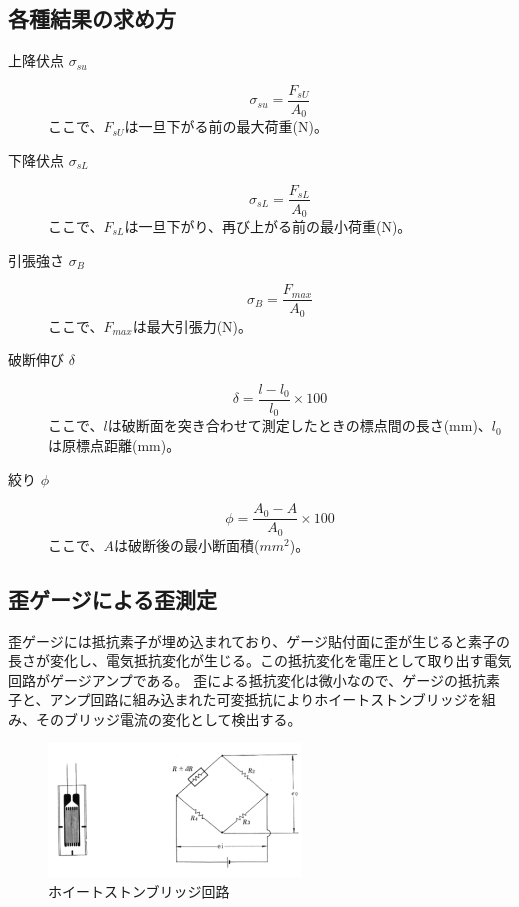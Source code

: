\documentclass[11pt, a4paper, dvipdfmx]{jsreport}
\begin{document}
\subsection{各種結果の求め方}
\begin{description}
    \item[上降伏点 $\sigma_{su}$]
    $$
    \sigma_{su} = \frac{F_{sU}}{A_{0}}
    $$
    ここで、$F_{sU}$は一旦下がる前の最大荷重(N)。
    
    \item[下降伏点 $\sigma_{sL}$]
    $$
    \sigma_{sL} = \frac{F_{sL}}{A_{0}}
    $$
    ここで、$F_{sL}$は一旦下がり、再び上がる前の最小荷重(N)。
    
    \item[引張強さ $\sigma_{B}$]
    $$
    \sigma_{B} = \frac{F_{max}}{A_{0}}
    $$
    ここで、$F_{max}$は最大引張力(N)。
    
    \item[破断伸び $\delta$]
    $$
    \delta = \frac{l-l_{0}}{l_{0}} \times 100
    $$
    ここで、$l$は破断面を突き合わせて測定したときの標点間の長さ(mm)、$l_0$は原標点距離(mm)。

    \item[絞り $\phi$]
    $$
    \phi = \frac{A_0 - A}{A_0} \times 100
    $$
    ここで、$A$は破断後の最小断面積($mm^2$)。
\end{description}

\subsection{歪ゲージによる歪測定}
歪ゲージには抵抗素子が埋め込まれており、ゲージ貼付面に歪が生じると素子の長さが変化し、電気抵抗変化が生じる。この抵抗変化を電圧として取り出す電気回路がゲージアンプである。
歪による抵抗変化は微小なので、ゲージの抵抗素子と、アンプ回路に組み込まれた可変抵抗によりホイートストンブリッジを組み、そのブリッジ電流の変化として検出する。

\begin{figure}[H]
    \centering
    \includegraphics[width=0.6\textwidth]{summer/ship-experiment/tension/pictures/wheatstone.png}
    \caption{ホイートストンブリッジ回路}
    \label{fig:wheatstone}
\end{figure}
\end{document}
